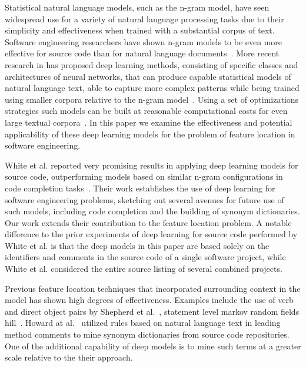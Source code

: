 


%
%
Statistical natural language models, such as the n-gram model, have
seen widespread use for a variety of natural language processing tasks
due to their simplicity and effectiveness when trained with a
substantial corpus of text. Software engineering researchers have
shown n-gram models to be even more effective for source code than for
natural language documents~\cite{hindle_naturalness_2012}. More recent
research in has proposed deep learning methods, consisting of specific
classes and architectures of neural networks, that can produce capable
statistical models of natural language text, able to capture more
complex patterns while being trained using smaller corpora relative to
the n-gram model~\cite{mikolov_distributed_2013}. Using a set of
optimizations strategies such models can be built at reasonable
computational costs for even large textual
corpora~\cite{le_distributed_2014}. In this paper we examine the
effectiveness and potential applicability of these deep learning
models for the problem of feature location in software engineering.



White et al. reported very promising results in applying deep learning
models for source code, outperforming models based on similar n-gram
configurations in code completion tasks~\cite{white-paper}. Their work
establishes the use of deep learning for software engineering
problems, sketching out several avenues for future use of such models,
including code completion and the building of synonym
dictionaries. Our work extends their contribution to the feature
location problem. A notable difference to the prior experiments of
deep learning for source code performed by White et al. is that the
deep models in this paper are based solely on the identifiers and
comments in the source code of a single software project, while White
et al. considered the entire source listing of several combined
projects.





Previous feature location techniques that incorporated surrounding
context in the model has shown high degrees of effectiveness. Examples
include the use of verb and direct object pairs by Shepherd et
al.~\cite{dave}, statement level markov random fields
hill~\cite{hill_use_2014}. Howard at al.~\cite{howard} utilized rules
based on natural language text in leading method comments to mine
synonym dictionaries from source code repositories. One of the
additional capability of deep models is to mine such terms at a
greater scale relative to the their approach.
